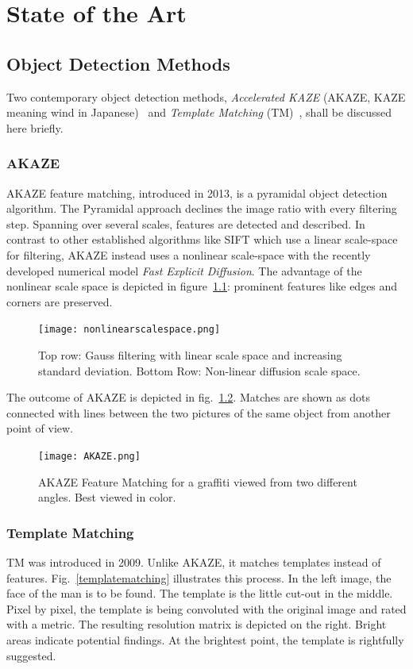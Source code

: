 \chapter{State of the Art\label{cha:chapter2}}
\section{Object Detection Methods}
Two contemporary object detection methods, \textit{Accelerated KAZE} (AKAZE, KAZE meaning wind in Japanese)~\cite{Alcantarilla2012KAZEFeatures, Alcantarilla2013FastSpaces} and \textit{Template Matching} (TM)~\cite{Brunelli2009TemplatePractice}, shall be discussed here briefly.

\subsection{AKAZE}
AKAZE feature matching, introduced in 2013, is a pyramidal object detection algorithm. The Pyramidal approach declines the image ratio with every filtering step. Spanning over several scales, features are detected and described. In contrast to other established algorithms like SIFT which use a linear scale-space for filtering, AKAZE instead uses a nonlinear scale-space with the recently developed numerical model \textit{Fast Explicit Diffusion}. The advantage of the nonlinear scale space is depicted in figure~\ref{skalenraum}: prominent features like edges and corners are preserved. 
\begin{figure}[ht]
	\centering
  \texttt{[image: nonlinearscalespace.png]}
	\caption[Gauss filtering]{Top row: Gauss filtering with linear scale space and increasing standard deviation. Bottom Row: Non-linear diffusion scale space.~\cite{Alcantarilla2012KAZEFeatures}}
	\label{skalenraum}
\end{figure}
The outcome of AKAZE is depicted in fig.~\ref{AKAZE}. Matches are shown as dots connected with lines between the two pictures of the same object from another point of view.
\begin{figure}[ht]
	\centering
  \texttt{[image: AKAZE.png]}
	\caption[AKAZE Feature Matching]{AKAZE Feature Matching for a graffiti viewed from two different angles. Best viewed in color.~\cite{OpenCV-DocumentationTutorial2018}}
	\label{AKAZE}
\end{figure}

\subsection{Template Matching}
TM was introduced in 2009. Unlike AKAZE, it matches templates instead of features. Fig.~\ref{templatematching} illustrates this process. In the left image, the face of the man is to be found. The template is the little cut-out in the middle. Pixel by pixel, the template is being convoluted with the original image and rated with a metric. The resulting resolution matrix is depicted on the right. Bright areas indicate potential findings. At the brightest point, the template is rightfully suggested.

